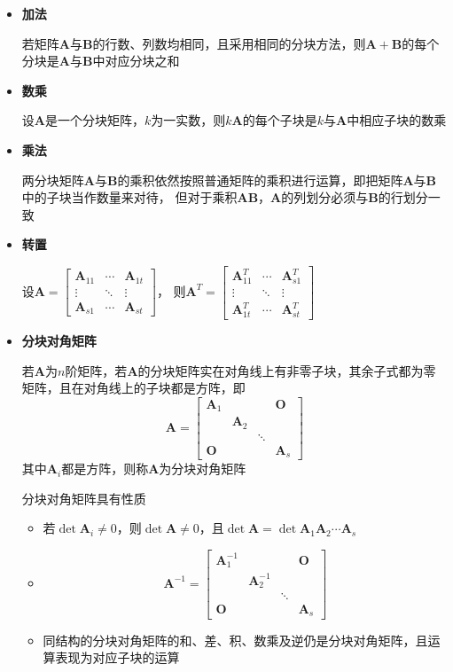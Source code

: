 \documentclass[UTF8]{ctexart}
\newcommand{\ve}[1]{{\bm{#1}}}
\newcommand{\mat}[1]{\ve{#1}}
\begin{document}
\begin{itemize}
  \item \textbf{加法}

   若矩阵$\mat{A}$与$\mat{B}$的行数、列数均相同，且采用相同的分块方法，则$\mat{A}+\mat{B}$的每个分块是$\mat{A}$与$\mat{B}$中对应分块之和
  \item \textbf{数乘}

  设$\mat{A}$是一个分块矩阵，$k$为一实数，则$k\mat{A}$的每个子块是$k$与$\mat{A}$中相应子块的数乘
  \item \textbf{乘法}

  两分块矩阵$\mat{A}$与$\mat{B}$的乘积依然按照普通矩阵的乘积进行运算，即把矩阵$\mat{A}$与$\mat{B}$中的子块当作数量来对待，
  但对于乘积$\mat{A}\mat{B}$，$\mat{A}$的列划分必须与$\mat{B}$的行划分一致
  \item \textbf{转置}

  设$\displaystyle\mat{A}=\begin{bmatrix}\mat{A}_{11}&\cdots&\mat{A}_{1t}\\\vdots&\ddots&\vdots\\\mat{A}_{s1}&\cdots&\mat{A}_{st}\end{bmatrix}$，
  则$\displaystyle\mat{A}^T=\begin{bmatrix}\mat{A}_{11}^T&\cdots&\mat{A}_{s1}^T\\\vdots&\ddots&\vdots\\\mat{A}_{1t}^T&\cdots&\mat{A}_{st}^T\end{bmatrix}$
  \item \textbf{分块对角矩阵}

  若$\mat{A}$为$n$阶矩阵，若$\mat{A}$的分块矩阵实在对角线上有非零子块，其余子式都为零矩阵，且在对角线上的子块都是方阵，即
  \[\mat{A}=\begin{bmatrix}
  \mat{A}_1&&&\mat{O}\\
  &\mat{A}_2\\
  &&\ddots\\
  \mat{O}&&&\mat{A}_s
  \end{bmatrix}\]
  其中$\mat{A}_i$都是方阵，则称$\mat{A}$为分块对角矩阵

  分块对角矩阵具有性质
  \begin{itemize}
    \item 若$\det\mat{A}_i\ne0$，则$\det\mat{A}\ne0$，且$\det\mat{A}=\det\mat{A}_1\mat{A}_2\cdots\mat{A}_s$
    \item \[\mat{A}^{-1}=\begin{bmatrix}
    \mat{A}_1^{-1}&&&\mat{O}\\
    &\mat{A}_2^{-1}\\
    &&\ddots\\
    \mat{O}&&&\mat{A}_s
    \end{bmatrix}\]
    \item 同结构的分块对角矩阵的和、差、积、数乘及逆仍是分块对角矩阵，且运算表现为对应子块的运算
  \end{itemize}


\end{itemize}
\end{document}
